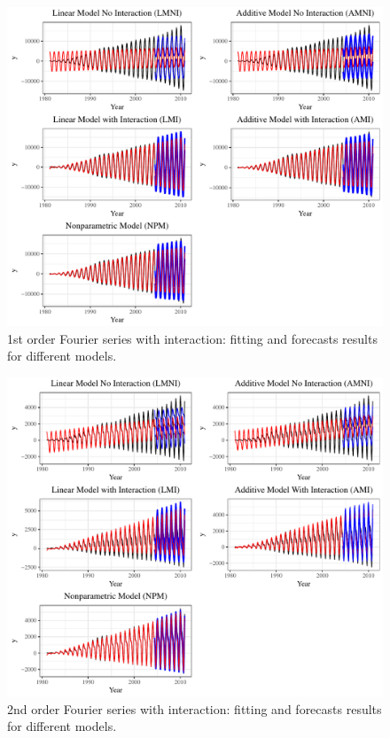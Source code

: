 \documentclass{article}\usepackage[]{graphicx}\usepackage[]{color}
\begin{document}
\begin{figure}[bp!]
\centering
\includegraphics[scale=0.7]{1st_order_inter.pdf}
\caption{1st order Fourier series with interaction: fitting and forecasts results for different models.}
\label{fig:1st Fourier inter}
\end{figure}


\begin{figure}[bp!]
\centering
\includegraphics[scale=0.7]{2nd_order_inter.pdf}
\caption{2nd order Fourier series with interaction: fitting and forecasts results for different models.}
\label{fig:2nd Fourier inter}
\end{figure}
\end{document}
